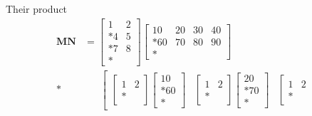 \documentclass{article}
\begin{document}
Their product
\begin{equation}
    \begin{aligned}
        \mathbf{MN}
            &{}= \left[
                \begin{matrix}
                    1 & 2 \\*
                    4 & 5 \\*
                    7 & 8 \\*
                \end{matrix}
            \right]
            \left[
                \begin{matrix}
                    10 & 20 & 30 & 40 \\*
                    60 & 70 & 80 & 90 \\*
                \end{matrix}
            \right] 
        \\*
            &{}\phantom:= \left[
                \begin{matrix}
                        \left[
                            \begin{matrix}
                                1 & 2 \\*
                            \end{matrix}
                        \right]
                        \left[
                            \begin{matrix}
                                10 \\* 60 \\*
                            \end{matrix}
                        \right]
                    &
                        \left[
                            \begin{matrix}
                                1 & 2 \\*
                            \end{matrix}
                        \right]
                        \left[
                            \begin{matrix}
                                20 \\* 70 \\*
                            \end{matrix}
                        \right]
                    &
                        \left[
                            \begin{matrix}
                                1 & 2 \\*

\end{matrix}
\end{matrix}
\end{aligned}
\end{equation}
\end{document}
